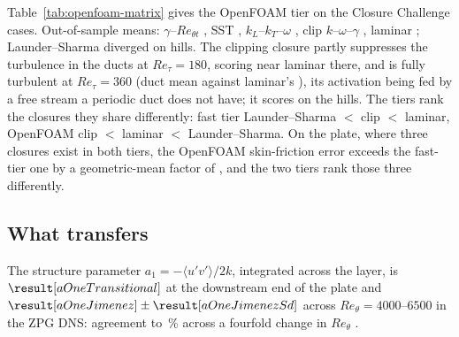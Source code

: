\documentclass[lineno]{jfm}
\begin{document}
Table~\ref{tab:openfoam-matrix} gives the OpenFOAM tier on the
 Closure Challenge cases. Out-of-sample means:
$\gamma$--$Re_{\theta t}$ ,
SST ,
$k_L$--$k_T$--$\omega$ ,
clip $k$--$\omega$--$\gamma$
, laminar
; Launder--Sharma diverged on
 hills. The clipping closure
partly suppresses the turbulence in the ducts at $Re_\tau = 180$, scoring
near laminar there, and is fully turbulent at $Re_\tau = 360$ (duct mean
 against laminar's
), its activation being fed by a free
stream a periodic duct does not have; it scores
 on the hills. The tiers rank
the closures they share differently: fast tier Launder--Sharma $<$ clip
$<$ laminar, OpenFOAM clip $<$ laminar $<$ Launder--Sharma. On the plate,
where three closures exist in both tiers, the OpenFOAM skin-friction error
exceeds the fast-tier one by a geometric-mean factor of
, and the two tiers rank those three
differently.

\begin{table}
  \begin{center}
  \footnotesize
  \openfoamTierMatrix
  \caption{OpenFOAM tier: normalized score for every closure on every
    Closure Challenge case. div.\ = diverged or not converged. Every case is
    out of sample for every closure.}
  \label{tab:openfoam-matrix}
  \end{center}
\end{table}

\subsection{What transfers}\label{sec:transfers}

The structure parameter $a_1 = -\langle u'v'\rangle / 2k$, integrated across
the layer, is $\result[aOneTransitional]$ at the downstream end of the plate
and $\result[aOneJimenez] \pm \result[aOneJimenezSd]$ across
$Re_\theta = 4000$--$6500$ in the ZPG DNS: agreement to
\result[aOneRelDiff]\,\% across a fourfold change in $Re_\theta$
\citep[Bradshaw's constant,][]{Bradshaw1967}.
\end{document}
